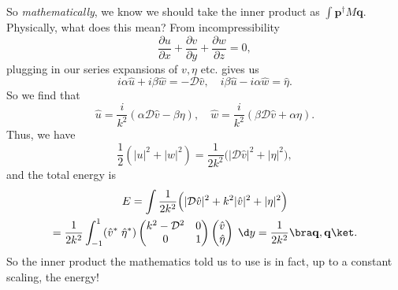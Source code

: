 \documentclass[a4paper]{article}
\begin{document}
So \emph{mathematically}, we know we should take the inner product as $\int \mathbf{p}^\dagger M \mathbf{q}$. Physically, what does this mean? From incompressibility
\[
  \frac{\partial u}{\partial x} + \frac{\partial v}{\partial y} + \frac{\partial w}{\partial z} = 0,
\]
plugging in our series expansions of $v, \eta$ etc. gives us
\[
  i\alpha \hat{u} + i \beta \hat{w} = - \mathcal{D} \hat{v},\quad i\beta \hat{u} - i\alpha \hat{w} = \hat{\eta}.
\]
So we find that
\[
  \hat{u} = \frac{i}{k^2}(\alpha \mathcal{D} \hat{v} - \beta \eta),\quad \hat{w} = \frac{i}{k^2}(\beta \mathcal{D} \hat{v} + \alpha \eta).
\]
Thus, we have
\[
  \frac{1}{2}(|u|^2 + |w|^2) = \frac{1}{2k^2} \Big(|\mathcal{D} \hat{v}|^2 + |\eta|^2\Big),
\]
and the total energy is
\begin{multline*}
  E = \int \frac{1}{2k^2} \Big(|\mathcal{D} \hat{v}|^2 + k^2 |\hat{v}|^2 + |\eta|^2\Big)\\
  = \frac{1}{2k^2} \int_{-1}^1 (\hat{v}^*\; \hat{\eta}^*)
  \begin{pmatrix}
    k^2 - \mathcal{D}^2 & 0\\
    0 & 1
  \end{pmatrix}
  \begin{pmatrix}
    \hat{v}\\
    \hat{\eta}
  \end{pmatrix}\;\d y = \frac{1}{2k^2}\bra \mathbf{q}, \mathbf{q}\ket.
\end{multline*}
So the inner product the mathematics told us to use is in fact, up to a constant scaling, the energy!
\end{document}
